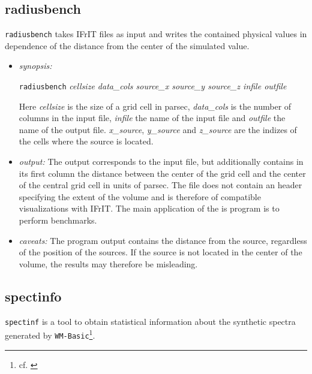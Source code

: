 \documentclass[a4paper,10pt]{article}
\begin{document}
\subsection{radiusbench}
\label{util:radiusbench}
\texttt{radiusbench} takes IFrIT files as input and writes the contained  
 physical values in dependence of the distance from the center of the simulated 
 value.

\begin{itemize}
\item \textit{synopsis:}

 \begin{center} 
 \texttt{radiusbench} \textit{cellsize data\_cols source\_x source\_y source\_z 
  infile outfile}
 \end{center}

 Here \textit{cellsize} is the size of a grid cell in parsec, 
 \textit{data\_cols} is the number of columns in the input file, 
 \textit{infile} the name of the input file and \textit{outfile} the name of 
 the output file. \textit{x\_source}, \textit{y\_source} and \textit{z\_source} 
 are the indizes of the cells where the source is located.

\item \textit{output:} 
 The output corresponds to the  input file, but additionally contains in its 
 first column the distance between the center of the grid cell and the center 
 of the central grid cell in units of parsec. The file does not contain an 
 header specifying the extent of the volume and is therefore of compatible
 visualizations with IFrIT. The main application of the is program is to perform 
 benchmarks.

\item \textit{caveats:} The program output contains the distance from the  
 source, regardless of the position of the sources. If the source is not 
 located in the center of the volume, the results may therefore be misleading.
\end{itemize}

\subsection{spectinfo}
\label{util:spectinfo}
\texttt{spectinf} is a tool to obtain statistical information about the  
synthetic spectra generated by \texttt{WM-Basic}\footnote{cf. 
\cite{Pauldrach2001}}.
\end{document}
